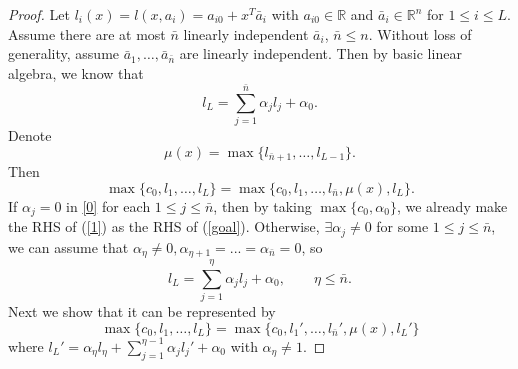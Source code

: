 \begin{proof}
		Let $l_i(x)=l(x,a_i)=a_{i0}+x^T\bar{a}_i$ with $a_{i0}\in\mathbb{R}$ and $\bar{a}_i\in\mathbb{R}^n$ for $1\le i\le L$. Assume there are at most $\bar{n}$ linearly independent $\bar{a}_i$, $\bar{n}\le n$. Without loss of generality, assume $\bar{a}_1,\dots,\bar{a}_{\bar{n}}$ are linearly independent. Then by basic linear algebra, we know that 
		\begin{equation}\label{0}
		l_L=\sum_{j=1}^{\bar{n}}\alpha_j l_j+\alpha_0.
		\end{equation}
		Denote
		$$
		\mu(x)=\max\{l_{\bar{n}+1},\dots,l_{L-1}\}.
		$$
		Then
		\begin{equation}\label{1}
		\max\{c_0,l_1,\dots,l_L\}=\max\{c_0,l_1,\dots,l_{\bar{n}},\mu(x),l_L\}.
		\end{equation}
		 If $\alpha_j = 0$ in \eqref{0} for each $1\le j\le \bar{n}$, then by taking $\max\{c_0,\alpha_0\}$, we already make the RHS of (\ref{1}) as the RHS of (\ref{goal}). Otherwise, $\exists \alpha_j\ne0$ for some $1\le j\le \bar{n}$, we can assume that $\alpha_{\eta} \neq 0, \alpha_{\eta+1}= ... = \alpha_{\bar{n}}=0$, so 
		$$
		l_L=\sum_{j=1}^{\eta}\alpha_j l_j+\alpha_0,\qquad \eta\le \bar{n}.
		$$ 
		Next we show that it can be represented by
		\begin{equation}\label{latticereaarange1}
		\max\{c_0,l_1,\dots,l_L\}=\max\{c_0,l_1',\dots,l_{\bar{n}}',\mu(x),l_L'\}
		\end{equation}
		where $\displaystyle l_L'=\alpha_\eta l_\eta+\sum_{j=1}^{\eta-1}\alpha_jl_j'+\alpha_0$ with $\alpha_\eta\neq 1$.
		

\end{proof}

